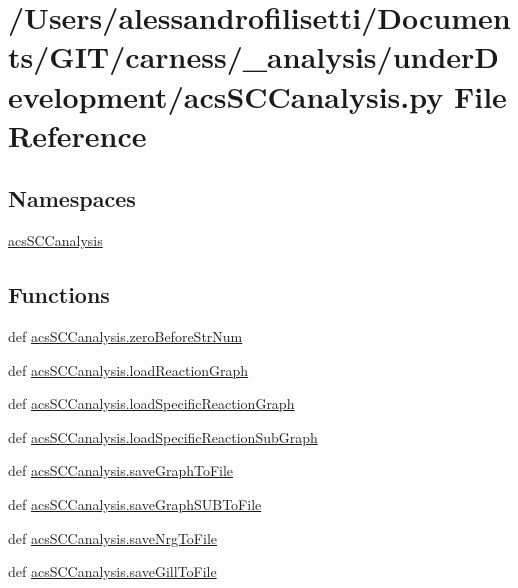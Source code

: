 \hypertarget{a00045}{\section{/\-Users/alessandrofilisetti/\-Documents/\-G\-I\-T/carness/\-\_\-analysis/under\-Development/acs\-S\-C\-Canalysis.py File Reference}
\label{a00045}
}
\subsection*{Namespaces}
\begin{DoxyCompactItemize}
\item 
\hyperlink{a00102}{acs\-S\-C\-Canalysis}
\end{DoxyCompactItemize}
\subsection*{Functions}
\begin{DoxyCompactItemize}
\item 
def \hyperlink{a00102_ab46df2a2027edcf1b07fc012b691b9d6}{acs\-S\-C\-Canalysis.\-zero\-Before\-Str\-Num}
\item 
def \hyperlink{a00102_a4c179674ced261fa5a003a679647d7f3}{acs\-S\-C\-Canalysis.\-load\-Reaction\-Graph}
\item 
def \hyperlink{a00102_a7517a12f1c90a0ae0e997161079676bd}{acs\-S\-C\-Canalysis.\-load\-Specific\-Reaction\-Graph}
\item 
def \hyperlink{a00102_ab9d3c9c8514469b4dea42d8caacb3937}{acs\-S\-C\-Canalysis.\-load\-Specific\-Reaction\-Sub\-Graph}
\item 
def \hyperlink{a00102_abf8df0ca8eb1c3ae9aeb0b20813d93d2}{acs\-S\-C\-Canalysis.\-save\-Graph\-To\-File}
\item 
def \hyperlink{a00102_a5c959ea7dd3d2bd42004f1e5fd41f249}{acs\-S\-C\-Canalysis.\-save\-Graph\-S\-U\-B\-To\-File}
\item 
def \hyperlink{a00102_a541e9f38936fdf58fde0869521fdc5fc}{acs\-S\-C\-Canalysis.\-save\-Nrg\-To\-File}
\item 
def \hyperlink{a00102_ae6d4582e548a062fb38bf6aaa62e1558}{acs\-S\-C\-Canalysis.\-save\-Gill\-To\-File}
\end{DoxyCompactItemize}

